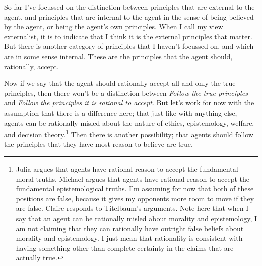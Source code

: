 So far I've focussed on the distinction between principles that are external to the agent, and principles that are internal to the agent in the sense of being believed by the agent, or being the agent's own principles. When I call my view externalist, it is to indicate that I think it is the external principles that matter. But there is another category of principles that I haven't focussed on, and which are in some sense internal. These are the principles that the agent should, rationally, accept.

Now if we say that the agent should rationally accept all and only the true principles, then there won't be a distinction between \emph{Follow the true principles} and \emph{Follow the principles it is rational to accept}. But let's work for now with the assumption that there is a difference here; that just like with anything else, agents can be rationally misled about the nature of ethics, epistemology, welfare, and decision theory.\footnote{Julia \citet{Markovits2014} argues that agents have rational reason to accept the fundamental moral truths. Michael \citet{Titelbaum2015} argues that agents have rational reason to accept the fundamental epistemological truths. I'm assuming for now that both of these positions are false, because it gives my opponents more room to move if they are false. Claire \citet{Field2017} responds to Titelbaum's arguments. Note here that when I say that an agent can be rationally misled about morality and epistemology, I am not claiming that they can rationally have outright false beliefs about morality and epistemology. I just mean that rationality is consistent with having something other than complete certainty in the claims that are actually true.} Then there is another possibility; that agents should follow the principles that they have most reason to believe are true.

